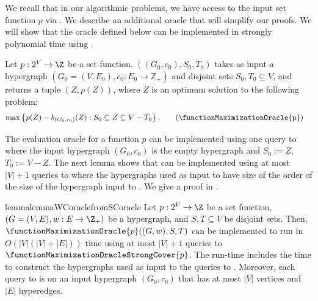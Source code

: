 We recall that in our algorithmic problems, we have access to the input set function $p$ via . 
We describe an additional oracle that will simplify our proofs. We will show that the oracle defined below can be implemented in strongly polynomial time using . 
\begin{definition}
    Let $p: 2^V\rightarrow \Z$ be a set function. 
    $((G_0, c_0), S_0, T_0)$ takes as input a hypergraph $(G_0=(V, E_0), c_0: E_0\rightarrow \mathbb{Z}_{+})$  
    and disjoint sets $S_0, T_0\subseteq V$, and returns a tuple $(Z, p(Z))$, where $Z$ is an optimum solution to the following problem:
    \begin{align*}
        \max & \left\{p(Z)-b_{(G_0, c_0)}(Z): S_0\subseteq Z\subseteq V-T_0\right\}. \tag{\functionMaximizationOracle{p}}\label{tag:oracle-main}
        \end{align*} 
\end{definition}
The evaluation oracle for a function $p$ can be implemented using one query to  
 where the input hypergraph $(G_0, c_0)$ is the empty hypergraph and $S_0 := Z$, $T_0 := V - Z$. The next lemma shows that  can be implemented using at most $|V|+1$ queries to  where the hypergraphs used as input to   have size of the order of the size of the hypergraph input to . We give a proof in .  

\begin{restatable}{lemma}{lemmaWCoraclefromSCoracle}\label{lem:Preliminaries:wc-oracle-from-sc-oracle}
Let $p: 2^V\rightarrow \Z$ be a set function, $(G = (V, E), w:E\rightarrow\Z_+)$ be a hypergraph, and $S, T \subseteq V$ be disjoint sets. Then, $\functionMaximizationOracle{p}((G, w), S, T)$ can be implemented to run in $O(|V|(|V|+|E|))$ time using at most $|V|+1$ queries to $\functionMaximizationOracleStrongCover{p}$.
The run-time includes the time to construct the hypergraphs used as input to the queries to . Moreover, each query to  is on an input hypergraph $(G_0, c_0)$ that has at most $|V|$ vertices and $|E|$ hyperedges.
\end{restatable}


